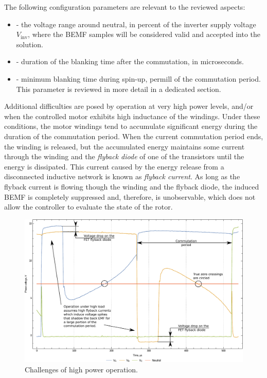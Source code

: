 \documentclass{zubaxdoc}
\begin{document}
The following configuration parameters are relevant to the reviewed aspects:

\begin{itemize}
\item {} - the voltage range around neutral,
in percent of the inverter supply voltage $V_\text{inv}$, where the BEMF samples
will be considered valid and accepted into the solution.
\item {} - duration of the blanking time after the commutation, in microseconds.
\item {} - minimum blanking time during spin-up, permill of the commutation period.
This parameter is reviewed in more detail in a dedicated section.
\end{itemize}

Additional difficulties are posed by operation at very high power levels,
and/or when the controlled motor exhibits high inductance of the windings.
Under these conditions, the motor windings tend to accumulate significant energy during the duration
of the commutation period.
When the current commutation period ends, the winding is released, but the accumulated energy maintains
some current through the winding and the \emph{flyback diode} of one of the transistors until
the energy is dissipated.
This current caused by the energy release from a disconnected inductive network is known as
\emph{flyback current}.
As long as the flyback current is flowing though the winding and the flyback diode,
the induced BEMF is completely suppressed and, therefore,
is unobservable, which does not allow the controller to evaluate the state of the rotor.

\begin{figure}[hbtp]
    \centering
	\includegraphics[width=\textwidth]{phase_voltages_at_high_load}
	\caption{Challenges of high power operation.
	\label{phase_voltages_at_high_load}}
\end{figure}
\end{document}
